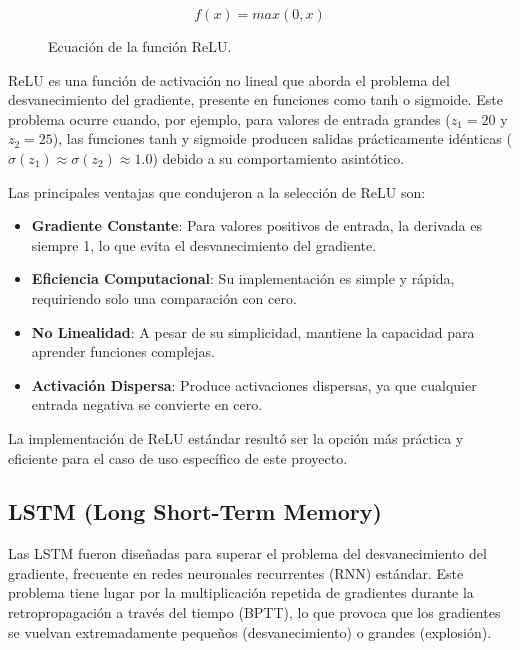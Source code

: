 \begin{figure}[h!]
    \centering
    \begin{equation}
        f(x) = max(0, x)
    \end{equation}
    \caption{Ecuación de la función ReLU.}
    \label{fig:relu_equation}
\end{figure}

ReLU es una función de activación no lineal que aborda el problema del desvanecimiento del gradiente, presente en funciones como tanh o sigmoide. Este problema ocurre cuando, por ejemplo, para valores de entrada grandes ($z_1 = 20$ y $z_2 = 25$), las funciones tanh y sigmoide producen salidas prácticamente idénticas ($\sigma(z_1) \approx \sigma(z_2) \approx 1.0$) debido a su comportamiento asintótico.

Las principales ventajas que condujeron a la selección de ReLU son:

\begin{itemize}
    \item \textbf{Gradiente Constante}: Para valores positivos de entrada, la derivada es siempre 1, lo que evita el desvanecimiento del gradiente.
    \item \textbf{Eficiencia Computacional}: Su implementación es simple y rápida, requiriendo solo una comparación con cero.
    \item \textbf{No Linealidad}: A pesar de su simplicidad, mantiene la capacidad para aprender funciones complejas.
    \item \textbf{Activación Dispersa}: Produce activaciones dispersas, ya que cualquier entrada negativa se convierte en cero.
\end{itemize}

La implementación de ReLU estándar resultó ser la opción más práctica y eficiente para el caso de uso específico de este proyecto.

\subsection{LSTM (Long Short-Term Memory)}

Las LSTM fueron diseñadas para superar el problema del desvanecimiento del gradiente, frecuente en redes neuronales recurrentes (RNN) estándar. Este problema tiene lugar por la multiplicación repetida de gradientes durante la retropropagación a través del tiempo (BPTT), lo que provoca que los gradientes se vuelvan extremadamente pequeños (desvanecimiento) o grandes (explosión).

